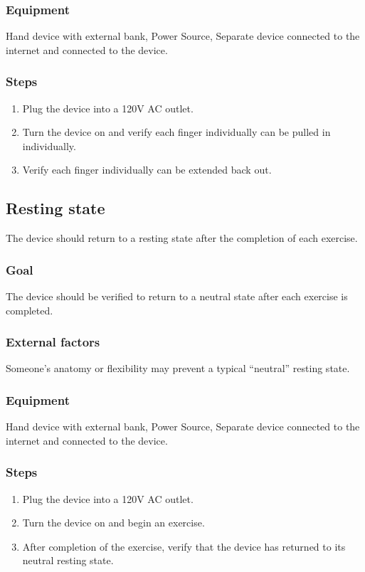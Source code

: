 \documentclass{article}
\begin{document}
\subsubsection{Equipment} Hand device with external bank, Power Source, Separate device connected to the internet and connected to the device.
\subsubsection{Steps}
\begin{enumerate}
\item Plug the device into a 120V AC outlet.
\item Turn the device on and verify each finger individually can be pulled in individually.
\item Verify each finger individually can be extended back out.
\end{enumerate}
\subsection{Resting state}
The device should return to a resting state after the completion of each exercise.
\subsubsection{Goal} The device should be verified to return to a neutral state after each exercise is completed.
\subsubsection{External factors} Someone’s anatomy or flexibility may prevent a typical “neutral” resting state.
\subsubsection{Equipment} Hand device with external bank, Power Source, Separate device connected to the internet and connected to the device.
\subsubsection{Steps}
\begin{enumerate}
\item Plug the device into a 120V AC outlet.
\item Turn the device on and begin an exercise.
\item After completion of the exercise, verify that the device has returned to its neutral resting state.
\end{enumerate}
\end{document}
